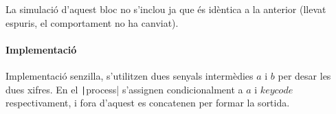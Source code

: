 La simulació d'aquest bloc no s'inclou ja que és idèntica a la anterior (llevat espuris,
el comportament no ha canviat).

\paragraph{Implementació}




Implementació senzilla, s'utilitzen dues senyals intermèdies $a$ i $b$
per desar les dues xifres. En el \texttt|process| s'assignen condicionalment a $a$
i $keycode$ respectivament, i fora d'aquest es concatenen per formar la sortida.

\vspace{1cm}
